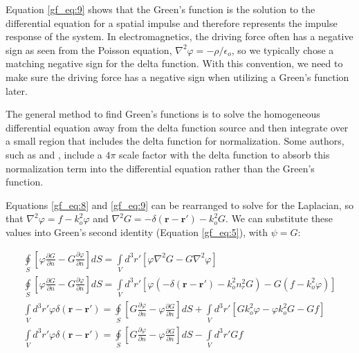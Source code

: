 Equation \ref{gf_eq:9} shows that the Green's function is the solution to the differential equation for a spatial impulse and therefore represents the impulse response of the system. In electromagnetics, the driving force often has a negative sign as seen from the Poisson equation, $\nabla^2\varphi = -\rho/\epsilon_o$, so we typically chose a matching negative sign for the delta function. With this convention, we need to make sure the driving force has a negative sign when utilizing a Green's function later.

The general method to find Green's functions is to solve the homogeneous differential equation away from the delta function source and then integrate over a small region that includes the delta function for normalization. Some authors, such as \cite{jackson_classical_em} and \cite{schwinger_em}, include a $4\pi$ scale factor with the delta function to absorb this normalization term into the differential equation rather than the Green's function.

Equations \ref{gf_eq:8} and \ref{gf_eq:9} can be rearranged to solve for the Laplacian, so that $\nabla^2\varphi = f - k_o^2\varphi$ and $\nabla^2G = -\delta\left(\mathbf{r}-\mathbf{r}' \right) - k_o^2G$. We can substitute these values into Green's second identity (Equation \ref{gf_eq:5}), with $\psi=G$:

\begin{equation}
\begin{gathered}
\oint\limits_{S} \left[ \varphi\frac{\partial G}{\partial n} - G\frac{\partial \varphi}{\partial n} \right]dS = \int\limits_{V}d^3r' \left[ \varphi\nabla^2G- G \nabla^2 \varphi\right] \\
\oint\limits_{S} \left[ \varphi\frac{\partial G}{\partial n} - G\frac{\partial \varphi}{\partial n} \right]dS = \int\limits_{V}d^3r' \left[ \varphi \left(-\delta\left(\mathbf{r}-\mathbf{r}' \right) - k_o^2n_r^2G\right)- G \left(f - k_o^2\varphi \right)\right] \\
\int\limits_{V}d^3r'\varphi\delta\left(\mathbf{r}-\mathbf{r}' \right) = \oint\limits_{S}\left[G\frac{\partial \varphi}{\partial n} - \varphi\frac{\partial G}{\partial n} \right]dS +\int\limits_{V}d^3r'\left[ Gk_o^2\varphi - \varphi k_o^2G - Gf \right] \\
\int\limits_{V}d^3r'\varphi\delta\left(\mathbf{r}-\mathbf{r}' \right) = \oint\limits_{S}\left[G\frac{\partial \varphi}{\partial n} - \varphi\frac{\partial G}{\partial n} \right]dS -\int\limits_{V}d^3r' Gf
\end{gathered}
\label{gf_eq:10}
\end{equation}
\renewcommand{\baselinestretch}{2} \small\normalsize

